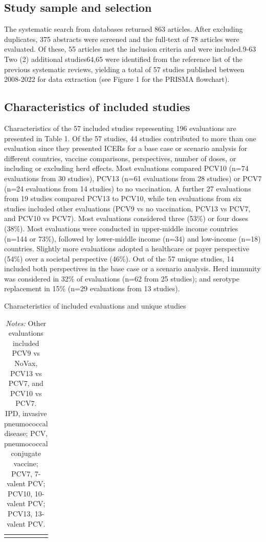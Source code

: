 \documentclass[12pt]{article}
\begin{document}
\subsection{Study sample and selection}
The systematic search from databases returned 863 articles. After excluding duplicates, 375 abstracts were screened and the full-text of 78 articles were evaluated. Of these, 55 articles met the inclusion criteria and were included.9-63 Two (2) additional studies64,65 were identified from the reference list of the previous systematic reviews, yielding a total of 57 studies published between 2008-2022 for data extraction (see  Figure 1 for the PRISMA flowchart). 

\subsection{Characteristics of included studies}
Characteristics of the 57 included studies representing 196 evaluations are presented in Table 1. Of the 57 studies, 44 studies contributed to more than one evaluation  since they presented ICERs for a base case or scenario analysis for different countries, vaccine comparisons, perspectives, number of doses, or including or excluding herd effects. Most evaluations compared PCV10 (n=74 evaluations from 30 studies), PCV13 (n=61 evaluations from 28 studies) or PCV7 (n=24 evaluations from 14 studies) to no vaccination. A further 27 evaluations from 19 studies compared PCV13 to PCV10, while ten evaluations from six studies included other evaluations (PCV9 vs no vaccination, PCV13 vs PCV7, and PCV10 vs PCV7). Most evaluations considered three (53\%) or four doses (38\%). Most evaluations were conducted in upper-middle income countries (n=144 or 73\%), followed by lower-middle income (n=34) and low-income (n=18) countries. Slightly more evaluations adopted a healthcare or payer perspective (54\%) over a societal perspective (46\%). Out of the 57 unique studies, 14 included both perspectives in the base case or a scenario analysis. Herd immunity was considered in 32\% of evaluations (n=62 from 25 studies); and serotype replacement in 15\% (n=29 evaluations from 13 studies). 


\begin{table}[H]
    \centering \singlespacing \small
    \caption{Characteristics of included evaluations and unique studies}
    \begin{tabular}{|L{6cm}|C{4.5cm}|C{4cm}|}
        \hline
    \end{tabular}
    \label{tab_evals_studies}
    \caption*{\footnotesize \textit{Notes:} Other evaluations included PCV9 vs NoVax, PCV13 vs PCV7, and PCV10 vs PCV7. \\
    IPD, invasive pneumococcal disease; PCV, pneumococcal conjugate vaccine; PCV7, 7-valent PCV; PCV10, 10-valent PCV; PCV13, 13-valent PCV. 
}
\end{table}
\end{document}
